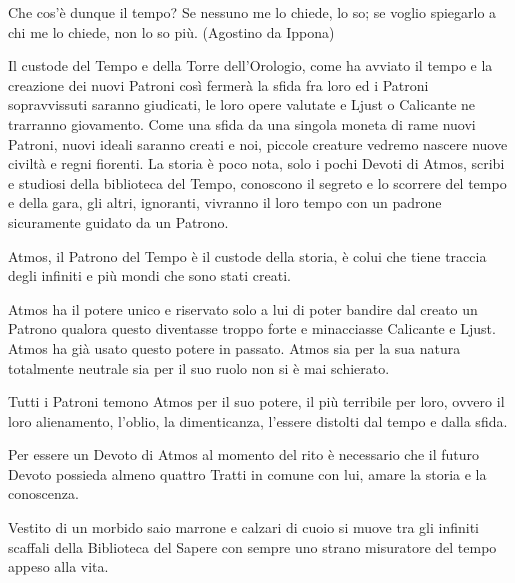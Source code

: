 \begin{multicols}{2}
\begin{enfasi}{
Che cos'è dunque il tempo? Se nessuno me lo chiede, lo so; se voglio spiegarlo a chi me lo chiede, non lo so più. (Agostino da Ippona)
}\end{enfasi}

Il custode del Tempo e della Torre dell'Orologio, come ha avviato il tempo e la creazione dei nuovi Patroni così fermerà la sfida fra loro ed i Patroni sopravvissuti saranno giudicati, le loro opere valutate e Ljust o Calicante ne trarranno giovamento. Come una sfida da una singola moneta di rame nuovi Patroni, nuovi ideali saranno creati e noi, piccole creature vedremo nascere nuove civiltà e regni fiorenti. La storia è poco nota, solo i pochi Devoti di Atmos, scribi e studiosi della biblioteca del Tempo, conoscono il segreto e lo scorrere del tempo e della gara, gli altri, ignoranti, vivranno il loro tempo con un padrone sicuramente guidato da un Patrono.

Atmos, il Patrono del Tempo è il custode della storia, è colui che tiene traccia degli infiniti e più mondi che sono stati creati.

Atmos ha il potere unico e riservato solo a lui di poter bandire dal creato un Patrono qualora questo diventasse troppo forte e minacciasse Calicante e Ljust. Atmos ha già usato questo potere in passato. Atmos sia per la sua natura totalmente neutrale sia per il suo ruolo non si è mai schierato.

Tutti i Patroni temono Atmos per il suo potere, il più terribile per loro, ovvero il loro alienamento, l'oblio, la dimenticanza, l'essere distolti dal tempo e dalla sfida.

Per essere un Devoto di Atmos al momento del rito è necessario che il futuro Devoto possieda almeno quattro Tratti in comune con lui, amare la storia e la conoscenza.

Vestito di un morbido saio marrone e calzari di cuoio si muove tra gli infiniti scaffali della Biblioteca del Sapere con sempre uno strano misuratore del tempo appeso alla vita.


\end{multicols}
